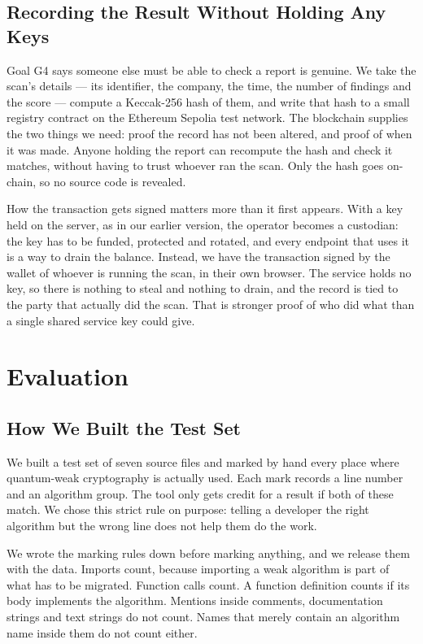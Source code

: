 \documentclass[runningheads]{llncs}
\begin{document}
\subsection{Recording the Result Without Holding Any Keys}
\label{sec:anchor}

Goal G4 says someone else must be able to check a report is genuine. We take the
scan's details --- its identifier, the company, the time, the number of findings
and the score --- compute a Keccak-256 hash of them, and write that hash to a
small registry contract on the Ethereum Sepolia test network. The blockchain
supplies the two things we need: proof the record has not been altered, and
proof of when it was made. Anyone holding the report can recompute the hash and
check it matches, without having to trust whoever ran the scan. Only the hash
goes on-chain, so no source code is revealed.

How the transaction gets signed matters more than it first appears. With a key
held on the server, as in our earlier version, the operator becomes a custodian:
the key has to be funded, protected and rotated, and every endpoint that uses it
is a way to drain the balance. Instead, we have the transaction signed by the
wallet of whoever is running the scan, in their own browser. The service holds
no key, so there is nothing to steal and nothing to drain, and the record is
tied to the party that actually did the scan. That is stronger proof of who did
what than a single shared service key could give.

\section{Evaluation}
\label{sec:eval}

\subsection{How We Built the Test Set}
\label{sec:benchmark}

We built a test set of seven source files and marked by hand every place where
quantum-weak cryptography is actually used. Each mark records a line number and
an algorithm group. The tool only gets credit for a result if both of these
match. We chose this strict rule on purpose: telling a developer the right
algorithm but the wrong line does not help them do the work.

We wrote the marking rules down before marking anything, and we release them
with the data. Imports count, because importing a weak algorithm is part of what
has to be migrated. Function calls count. A function definition counts if its
body implements the algorithm. Mentions inside comments, documentation strings
and text strings do not count. Names that merely contain an algorithm name
inside them do not count either.
\end{document}
